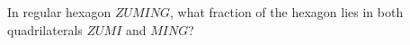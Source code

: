 In regular hexagon $ZUMING$, what fraction of the hexagon lies in both quadrilaterals $ZUMI$ and $MING$?
